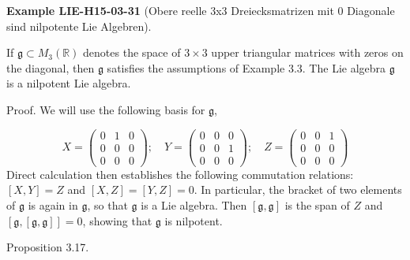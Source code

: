 \documentclass[10pt, letterpaper]{article}
\newcommand{\CustomHeading}[3]{%
  \par\medskip\noindent%
  \textbf{#1 #2} \textnormal{(#3)}.\enskip%
}
\newenvironment{EXA}[2]{\begin{unitbox}\CustomHeading{Example}{#1}{#2}}{\end{unitbox}}
\begin{document}
\begin{EXA}{LIE-H15-03-31}{Obere reelle 3x3 Dreiecksmatrizen mit 0 Diagonale sind nilpotente Lie Algebren}
If $\mathfrak{g} \subset M_{3}(\mathbb{R})$ denotes the space of $3 \times 3$ upper triangular matrices with zeros on the diagonal, then $\mathfrak{g}$ satisfies the assumptions of Example 3.3. The Lie algebra $\mathfrak{g}$ is a nilpotent Lie algebra.

Proof. We will use the following basis for $\mathfrak{g}$,

$$
X=\left(\begin{array}{ccc}
0 & 1 & 0 \\
0 & 0 & 0 \\
0 & 0 & 0
\end{array}\right) ; \quad Y=\left(\begin{array}{ccc}
0 & 0 & 0 \\
0 & 0 & 1 \\
0 & 0 & 0
\end{array}\right) ; \quad Z=\left(\begin{array}{ccc}
0 & 0 & 1 \\
0 & 0 & 0 \\
0 & 0 & 0
\end{array}\right)
$$
Direct calculation then establishes the following commutation relations: $[X, Y]= Z$ and $[X, Z]=[Y, Z]=0$. In particular, the bracket of two elements of $\mathfrak{g}$ is again in $\mathfrak{g}$, so that $\mathfrak{g}$ is a Lie algebra. Then $[\mathfrak{g}, \mathfrak{g}]$ is the span of $Z$ and $[\mathfrak{g},[\mathfrak{g}, \mathfrak{g}]]=0$, showing that $\mathfrak{g}$ is nilpotent.
\end{EXA}

Proposition 3.17. 
\end{document}
